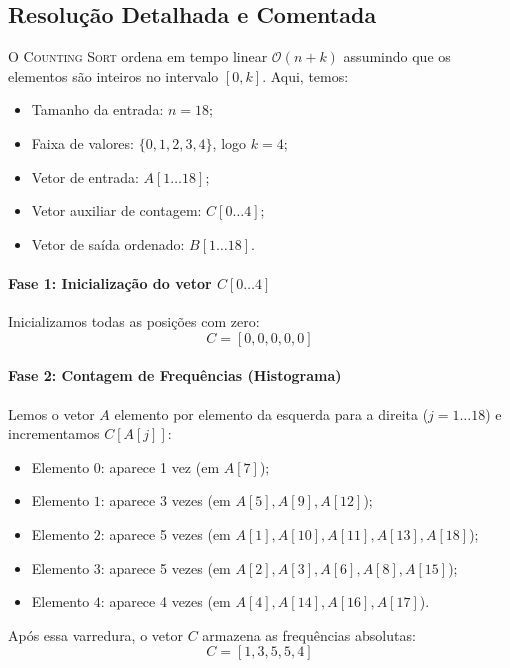\documentclass[11pt,a4paper]{article}
\begin{document}
\subsection*{Resolução Detalhada e Comentada}

O \textsc{Counting Sort} ordena em tempo linear $\mathcal{O}(n + k)$ assumindo que os elementos são inteiros no intervalo $[0, k]$.
Aqui, temos:
\begin{itemize}
    \item Tamanho da entrada: $n = 18$;
    \item Faixa de valores: $\{0, 1, 2, 3, 4\}$, logo $k = 4$;
    \item Vetor de entrada: $A[1 \dots 18]$;
    \item Vetor auxiliar de contagem: $C[0 \dots 4]$;
    \item Vetor de saída ordenado: $B[1 \dots 18]$.
\end{itemize}

\paragraph{Fase 1: Inicialização do vetor $C[0 \dots 4]$}
Inicializamos todas as posições com zero:
\[
C = [0, 0, 0, 0, 0]
\]

\paragraph{Fase 2: Contagem de Frequências (Histograma)}
Lemos o vetor $A$ elemento por elemento da esquerda para a direita ($j = 1 \dots 18$) e incrementamos $C[A[j]]$:
\begin{itemize}
    \item Elemento $0$: aparece 1 vez (em $A[7]$);
    \item Elemento $1$: aparece 3 vezes (em $A[5], A[9], A[12]$);
    \item Elemento $2$: aparece 5 vezes (em $A[1], A[10], A[11], A[13], A[18]$);
    \item Elemento $3$: aparece 5 vezes (em $A[2], A[3], A[6], A[8], A[15]$);
    \item Elemento $4$: aparece 4 vezes (em $A[4], A[14], A[16], A[17]$).
\end{itemize}
Após essa varredura, o vetor $C$ armazena as frequências absolutas:
\[
C = [1, 3, 5, 5, 4]
\]
\end{document}
